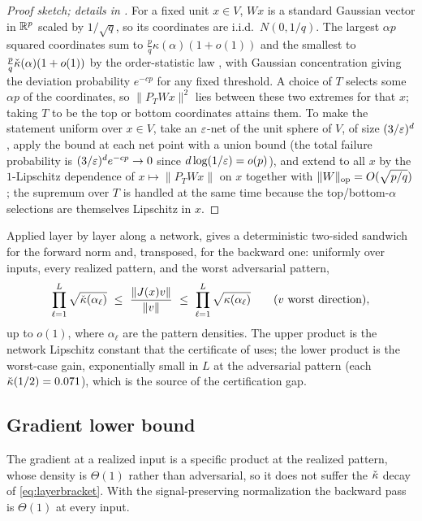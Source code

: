 \begin{proof}[Proof sketch; details in ]
For a fixed unit $x\in V$, $Wx$ is a standard Gaussian vector in $\mathbb{R}^p$ scaled by $1/\sqrt q$, so its
coordinates are i.i.d.\ $N(0,1/q)$. The largest $\alpha p$ squared coordinates sum to
$\tfrac pq\kappa(\alpha)(1+o(1))$ and the smallest to $\tfrac pq\check{\kappa}(\alpha)(1+o(1))$ by the
order-statistic law , with Gaussian concentration giving the deviation probability
$e^{-cp}$ for any fixed threshold. A choice of $T$ selects some $\alpha p$ of the coordinates, so
$\|P_TWx\|^2$ lies between these two extremes for that $x$; taking $T$ to be the top or bottom
coordinates attains them. To make the statement uniform over $x\in V$, take an $\varepsilon$-net of the unit
sphere of $V$, of size $(3/\varepsilon)^d$, apply the bound at each net point with a union bound (the total
failure probability is $(3/\varepsilon)^d e^{-cp}\to0$ since $d\log(1/\varepsilon)=o(p)$), and extend to all $x$ by
the $1$-Lipschitz dependence of $x\mapsto\|P_TWx\|$ on $x$ together with $\|W\|_{\mathrm{op}}=O(\sqrt{p/q})$; the
supremum over $T$ is handled at the same time because the top/bottom-$\alpha$ selections are themselves
Lipschitz in $x$.
\end{proof}

Applied layer by layer along a network,  gives a deterministic two-sided
sandwich for the forward norm and, transposed, for the backward one: uniformly over inputs, every
realized pattern, and the worst adversarial pattern,
\begin{equation}\label{eq:layerbracket}
  \prod_{\ell=1}^L\sqrt{\kcheck(\alpha_\ell)}\ \le\ \frac{\|J(x)v\|}{\|v\|}\ \le\
  \prod_{\ell=1}^L\sqrt{\kappa(\alpha_\ell)}\qquad(v\ \text{worst direction}),
\end{equation}
up to $o(1)$, where $\alpha_\ell$ are the pattern densities. The upper product is the network Lipschitz
constant that the certificate of \Cref{sec:certificates} uses; the lower product is the worst-case
gain, exponentially small in $L$ at the adversarial pattern (each $\check{\kappa}(1/2)=0.071$), which is the
source of the certification gap.

\subsection{Gradient lower bound}
The gradient at a realized input is a specific product at the realized pattern, whose density is
$\Theta(1)$ rather than adversarial, so it does not suffer the $\check{\kappa}$ decay of
\eqref{eq:layerbracket}. With the signal-preserving normalization the backward pass is $\Theta(1)$ at
every input.

